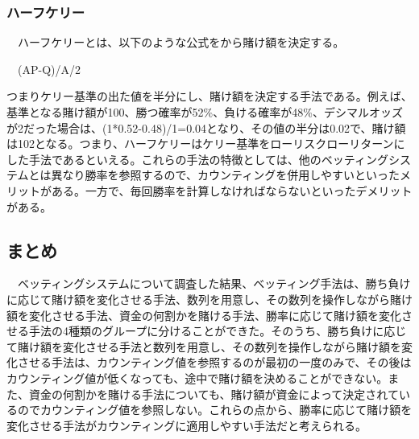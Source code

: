 \subsubsection{ハーフケリー}  
　ハーフケリーとは、以下のような公式をから賭け額を決定する。
\begin{center}　(AP-Q)/A/2
\end{center}
つまりケリー基準の出た値を半分にし、賭け額を決定する手法である。例えば、基準となる賭け額が100、勝つ確率が52\%、負ける確率が48\%、デシマルオッズが2だった場合は、(1*0.52-0.48)/1=0.04となり、その値の半分は0.02で、賭け額は102となる。つまり、ハーフケリーはケリー基準をローリスクローリターンにした手法であるといえる。これらの手法の特徴としては、他のベッティングシステムとは異なり勝率を参照するので、カウンティングを併用しやすいといったメリットがある。一方で、毎回勝率を計算しなければならないといったデメリットがある。

\subsection{まとめ}
　ベッティングシステムについて調査した結果、ベッティング手法は、勝ち負けに応じて賭け額を変化させる手法、数列を用意し、その数列を操作しながら賭け額を変化させる手法、資金の何割かを賭ける手法、勝率に応じて賭け額を変化させる手法の4種類のグループに分けることができた。そのうち、勝ち負けに応じて賭け額を変化させる手法と数列を用意し、その数列を操作しながら賭け額を変化させる手法は、カウンティング値を参照するのが最初の一度のみで、その後はカウンティング値が低くなっても、途中で賭け額を決めることができない。また、資金の何割かを賭ける手法についても、賭け額が資金によって決定されているのでカウンティング値を参照しない。これらの点から、勝率に応じて賭け額を変化させる手法がカウンティングに適用しやすい手法だと考えられる。
